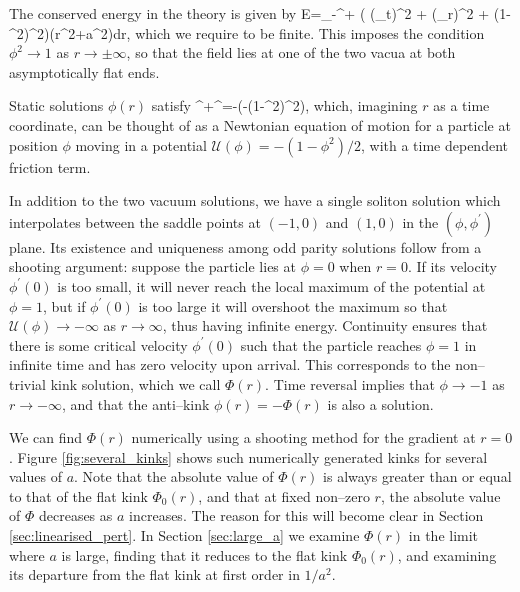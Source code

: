 The conserved energy in the theory is given by
\be
\nonumber
E=\int_{-\infty}^{+\infty} \bigg(  (\phi_t)^2 +  (\phi_r)^2 + (1-\phi^2)^2\bigg)(r^2+a^2)dr,
\ee
which we require to be finite. This imposes the condition $\phi^2\rightarrow 1$ as $r\rightarrow\pm\infty$, so that the field lies at one of the two vacua at both asymptotically flat ends.

Static solutions $\phi(r)$ satisfy
\be
\label{eom.static}
\phi^{\prime\prime}+\phi^{\prime}=-\bigg(-(1-\phi^2)^2\bigg),
\ee
which, imagining $r$ as a time coordinate, can be thought of as a Newtonian equation of motion for a particle at position $\phi$ moving in a potential $\mathcal{U}(\phi)=-(1-\phi^2)/2$, with a time dependent friction term.

In addition to the two vacuum solutions, we have a single soliton solution which interpolates between the saddle points at $(-1,0)$ and $(1,0)$ in the $(\phi,\phi^\prime)$ plane. Its existence and uniqueness among odd parity solutions follow from a shooting argument: suppose the particle lies at $\phi=0$ when $r=0$. If its velocity $\phi^\prime(0)$ is too small, it will never reach the local maximum of the potential at $\phi=1$, but if $\phi^\prime(0)$ is too large it will overshoot the maximum so that $\mathcal{U}(\phi)\rightarrow -\infty$ as $r\rightarrow\infty$, thus having infinite energy. Continuity ensures that there is some critical velocity $\phi^\prime(0)$ such that the particle reaches $\phi=1$ in infinite time and has zero velocity upon arrival. This corresponds to the non--trivial kink solution, which we call $\Phi(r)$. Time reversal implies that $\phi\rightarrow -1$ as $r\rightarrow -\infty$, and that the anti--kink $\phi(r)=-\Phi(r)$ is also a solution.

We can find $\Phi(r)$ numerically using a shooting method for the gradient at $r=0$. %
Figure \ref{fig:several_kinks} shows such numerically generated kinks for several values of $a$. Note that the absolute value of $\Phi(r)$ is always greater than or equal to that of the flat kink $\Phi_0(r)$, and that at fixed non--zero $r$, the absolute value of $\Phi$ decreases as $a$ increases. The reason for this will become clear in Section \ref{sec:linearised_pert}. In Section \ref{sec:large_a} we examine $\Phi(r)$ in the limit where $a$ is large, finding that it reduces to the flat kink $\Phi_0(r)$, and examining its departure from the flat kink at first order in $1/a^2$.

